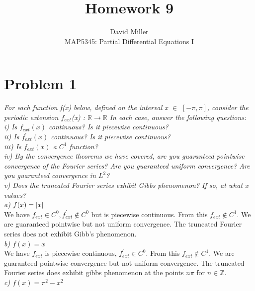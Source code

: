 \documentclass[12pt]{article}
\newcommand{\R}{\mathbb{R}}
\DeclarePairedDelimiter \abs{\lvert}{\rvert}%
\theoremstyle{remark}
\begin{document}
 
\title{Homework 9}
\author{David Miller \\ 
MAP5345: Partial Differential Equations I} 
 
\maketitle

\section*{Problem 1}

\textit{For each function f(x) below, defined on the interval x $\in$ $[-\pi, \pi]$, consider the periodic extension $f_{ext}$(x) : $\R \rightarrow \R$ In each case, answer the following questions:} \\
\textit{i) Is $f_{ext}(x)$ continuous? Is it piecewise continuous?} \\
\textit{ii) Is $f^\prime_{ext}(x)$ continuous? Is it piecewise continuous?} \\
\textit{iii) Is $f_{ext}(x)$ a $C^1$ function?} \\
\textit{iv) By the convergence theorems we have covered, are you guaranteed pointwise convergence of the Fourier series? Are you guaranteed uniform convergence? Are you guaranteed convergence in $L^2$?} \\ 
\textit{v) Does the truncated Fourier series exhibit Gibbs phenomenon? If so, at what x values?} \\

\textit{a) $f(x) = \abs{x}$} \\

We have $f_{ext} \in C^0, f^\prime_{ext} \not\in C^0$ but is piecewise continuous. From this $f_{ext} \not\in C^1$. We are guaranteed pointwise but not uniform convergence. The truncated Fourier series does not exhibit Gibb's phenomenon. \\

\textit{b) $f(x) = x$} \\

We have $f_{ext}$ is piecewise continuous, $f^\prime_{ext} \in C^0$. From this $f_{ext} \not\in C^1$. We are guaranteed pointwise convergence but not uniform convergence. The truncated Fourier series does exhibit gibbs phenomenon at the points $n\pi$ for $n \in \mathbb{Z}$. \\

\textit{c) $f(x) = \pi^2 - x^2$} \\
\end{document}
